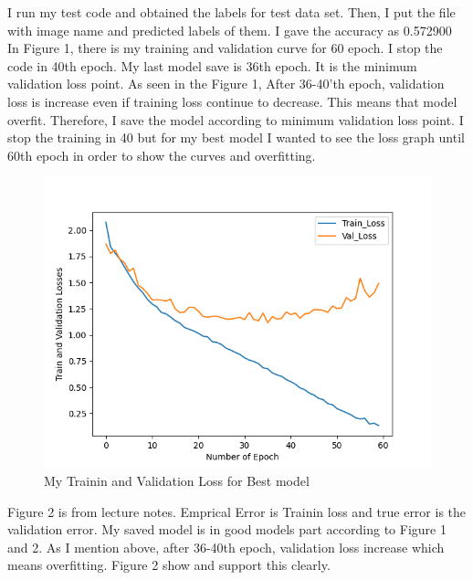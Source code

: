 \documentclass{article}
\begin{document}
I run my test code and obtained the labels for test data set. Then, I put the file with image name and predicted labels of them. I gave the accuracy as 0.572900 \\

In Figure 1, there is my training and validation curve for 60 epoch. I stop the code in 40th epoch. My last model save is 36th epoch. It is the minimum validation loss point. As seen in the Figure 1, After 36-40'th epoch, validation loss is increase even if training loss continue to decrease. This means that model overfit. Therefore, I save the model according to minimum validation loss point. I stop the training in 40 but for my best model I wanted to see the loss graph until 60th epoch in order to show the curves and overfitting. \\

\begin{figure}[H]
    \centering
    \includegraphics[width=\linewidth]{Figure_1.png}
    \caption{My Trainin and Validation Loss for Best model}
    \label{fig:my_model}
\end{figure}

Figure 2 is from lecture notes. Emprical Error is Trainin loss and true error is the validation error. My saved model is in good models part according to Figure 1 and 2. As I mention above, after 36-40th epoch, validation loss increase which means overfitting. Figure 2 show and support this clearly. 
\end{document}
